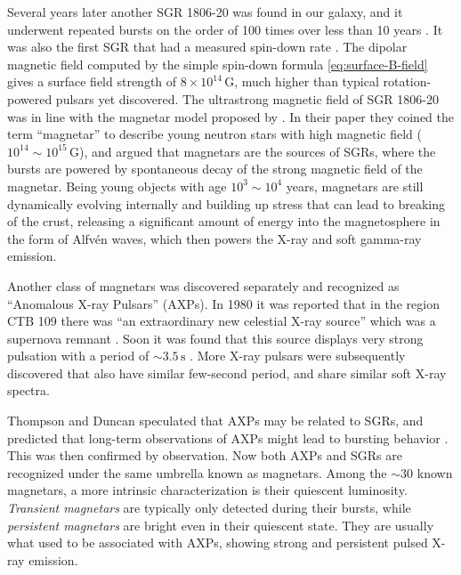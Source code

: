Several years later another SGR 1806-20 was found in our galaxy, and it
underwent repeated bursts on the order of 100 times over less than 10 years
\citep{kouveliotou_smm_1987,laros_new_1987}. It was also the first SGR that had
a measured spin-down rate \citep{kouveliotou_x-ray_1998}. The dipolar magnetic
field computed by the simple spin-down formula \eqref{eq:surface-B-field} gives
a surface field strength of $8\times 10^{14}\,\mathrm{G}$, much higher than
typical rotation-powered pulsars yet discovered. The ultrastrong magnetic field
of SGR 1806-20 was in line with the magnetar model proposed by
\citet{duncan_formation_1992}. In their paper they coined the term ``magnetar''
to describe young neutron stars with high magnetic field ($10^{14}\sim
10^{15}\,\mathrm{G}$), and argued that magnetars are the sources of SGRs, where
the bursts are powered by spontaneous decay of the strong magnetic field of the
magnetar. Being young objects with age $10^{3}\sim 10^{4}$ years, magnetars are
still dynamically evolving internally and building up stress that can lead to
breaking of the crust, releasing a significant amount of energy into the
magnetosphere in the form of Alfvén waves, which then powers the X-ray and soft
gamma-ray emission.

Another class of magnetars was discovered separately and recognized as
``Anomalous X-ray Pulsars'' (AXPs). In 1980 it was reported that in the
region CTB 109 there was ``an extraordinary new celestial X-ray
source'' which was a supernova remnant \citep{gregory_extraordinary_1980}. Soon
it was found that this source displays very strong pulsation with a period of
$\sim 3.5\,\mathrm{s}$ \citep{fahlman_x-ray_1981}. More X-ray pulsars were
subsequently discovered that also have similar few-second period, and share
similar soft X-ray spectra.

Thompson and Duncan speculated that AXPs may be related to SGRs, and predicted
that long-term observations of AXPs might lead to bursting behavior
\citet{thompson_soft_1996}. This was then confirmed by
observation. %
Now both AXPs and SGRs are recognized under the same umbrella known as
magnetars. Among the $\sim 30$ known magnetars, a more intrinsic
characterization is their quiescent luminosity. {\it Transient magnetars} are
typically only detected during their bursts, while {\it persistent magnetars}
are bright even in their quiescent state. They are usually what used to be
associated with AXPs, showing strong and persistent pulsed X-ray emission.

